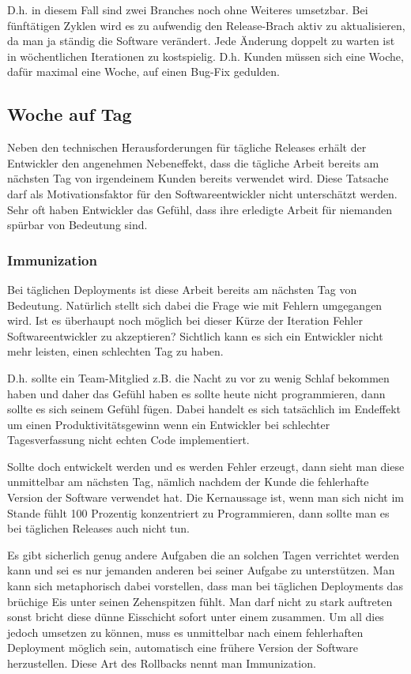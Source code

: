 D.h. in diesem Fall sind zwei Branches noch ohne Weiteres umsetzbar. Bei
fünftätigen Zyklen wird es zu aufwendig den Release-Brach aktiv zu
aktualisieren, da man ja ständig die Software verändert. Jede Änderung doppelt
zu warten ist in wöchentlichen Iterationen zu kostspielig. D.h. Kunden müssen
sich eine Woche, dafür maximal eine Woche, auf einen Bug-Fix gedulden.


\subsection{Woche auf Tag}
\label{subsec:subscription-modell}

Neben den technischen Herausforderungen für tägliche Releases erhält der
Entwickler den angenehmen Nebeneffekt, dass die tägliche Arbeit bereits am
nächsten Tag von irgendeinem Kunden bereits verwendet wird. Diese Tatsache
darf als Motivationsfaktor für den Softwareentwickler nicht unterschätzt
werden. Sehr oft haben Entwickler das Gefühl, dass ihre erledigte Arbeit für
niemanden spürbar von Bedeutung sind.

\subsubsection{Immunization}
Bei täglichen Deployments ist diese Arbeit bereits am nächsten Tag von
Bedeutung. Natürlich stellt sich dabei die Frage wie mit Fehlern umgegangen
wird. Ist es überhaupt noch möglich bei dieser Kürze der Iteration Fehler
Softwareentwickler zu akzeptieren? Sichtlich kann es sich ein Entwickler nicht
mehr leisten, einen schlechten Tag zu haben.

D.h. sollte ein Team-Mitglied z.B. die Nacht zu vor zu wenig Schlaf bekommen
haben und daher das Gefühl haben es sollte heute nicht programmieren, dann
sollte es sich seinem Gefühl fügen. Dabei handelt es sich tatsächlich im
Endeffekt um einen Produktivitätsgewinn wenn ein Entwickler bei schlechter
Tagesverfassung nicht echten Code implementiert.

Sollte doch entwickelt werden und es werden Fehler erzeugt, dann sieht man
diese unmittelbar am nächsten Tag, nämlich nachdem der Kunde die fehlerhafte
Version der Software verwendet hat. Die Kernaussage ist, wenn man sich nicht
im Stande fühlt 100 Prozentig konzentriert zu Programmieren, dann sollte man
es bei täglichen Releases auch nicht tun.

Es gibt sicherlich genug andere Aufgaben die an solchen Tagen verrichtet
werden kann und sei es nur jemanden anderen bei seiner Aufgabe zu
unterstützen. Man kann sich metaphorisch dabei vorstellen, dass man bei
täglichen Deployments das brüchige Eis unter seinen Zehenspitzen fühlt. Man
darf nicht zu stark auftreten sonst bricht diese dünne Eisschicht sofort unter
einem zusammen. Um all dies jedoch umsetzen zu können, muss es unmittelbar
nach einem fehlerhaften Deployment möglich sein, automatisch eine frühere
Version der Software herzustellen. Diese Art des Rollbacks nennt man
Immunization.

